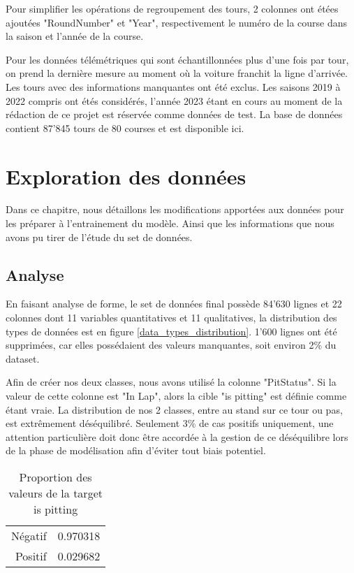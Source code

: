 Pour simplifier les opérations de regroupement des tours, 2 colonnes ont étées ajoutées "RoundNumber" et "Year", respectivement le numéro de la course dans la saison et l'année de la course.

Pour les données télémétriques qui sont échantillonnées plus d'une fois par tour,
on prend la dernière mesure au moment où la voiture franchit la ligne d'arrivée.
Les tours avec des informations manquantes ont été exclus.
Les saisons 2019 à 2022 compris ont étés considérés, l'année 2023 étant en cours au moment de la rédaction de ce projet
est réservée comme données de test. La base de données contient 87'845 tours de 80 courses et est disponible ici. %

\section{Exploration des données}
Dans ce chapitre, nous détaillons les modifications apportées aux données pour les préparer à l'entrainement du modèle.
Ainsi que les informations que nous avons pu tirer de l'étude du set de données.

\subsection{Analyse}

En faisant analyse de forme, le set de données final possède 84'630 lignes et 22 colonnes dont 11 variables quantitatives et 11 qualitatives, la distribution des types de données est en figure \ref{data_types_distribution}.
1'600 lignes ont été supprimées, car elles possédaient des valeurs manquantes, soit environ 2\% du dataset.

Afin de créer nos deux classes, nous avons utilisé la colonne "PitStatus". Si la valeur de cette colonne est "In Lap", alors la cible "is pitting" est définie comme étant vraie.
La distribution de nos 2 classes, entre au stand sur ce tour ou pas, est extrêmement déséquilibré.
Seulement 3\% de cas positifs uniquement, une attention particulière doit donc être accordée à la gestion de ce déséquilibre
lors de la phase de modélisation afin d'éviter tout biais potentiel.

\begin{table}[H]
    \begin{center}
        \caption{Proportion des valeurs de la target is pitting}
        \begin{tabular}{r|l}
            Négatif & 0.970318 \\
            Positif & 0.029682
        \end{tabular}
    \end{center}
\end{table}

